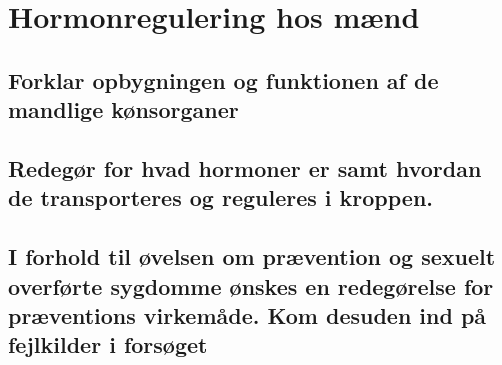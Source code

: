 \newpage
\section{Hormonregulering hos mænd}
\subsection{Forklar opbygningen og funktionen af de mandlige kønsorganer}
\subsection{Redegør for hvad hormoner er samt hvordan de transporteres og reguleres i kroppen.}
\subsection{I forhold til øvelsen om prævention og sexuelt overførte sygdomme ønskes en redegørelse for præventions virkemåde. Kom desuden ind på fejlkilder i forsøget}